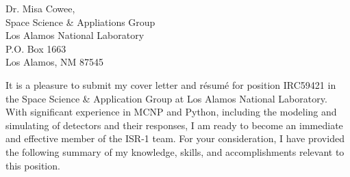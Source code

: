 
\begin{center}
\begin{minipage}{\textwidth}

  \normalsize

  \vspace{4mm} 


  Dr. Misa Cowee, \\

  Space Science \& Appliations Group \\
  Los Alamos National Laboratory \\
  P.O. Box 1663 \\
  Los Alamos, NM 87545 \\
  
  \vspace{2mm} 

  It is a pleasure to submit my cover letter and r\'{e}sum\'{e} for position IRC59421 in the Space Science \& Application Group at Los Alamos National Laboratory.
  With significant experience in \textsc{MCNP} and Python, including the modeling and simulating of detectors and their responses, I am ready to become an immediate and effective member of the ISR-1 team.
  For your consideration, I have provided the following summary of my knowledge, skills, and accomplishments relevant to this position.
  



\end{minipage}
\end{center}
